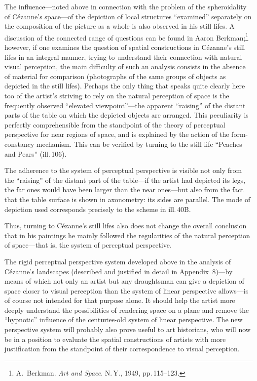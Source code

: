 
The influence---noted above in connection with the problem of the spheroidality of
Cézanne's space---of the depiction of local structures ``examined'' separately on
the composition of the picture as a whole is also observed in his still lifes. A
discussion of the connected range of questions can be found in Aaron
Berkman;\footnote{A.~Berkman. \emph{Art and Space}. N.\,Y., 1949, pp.\,115--123.}
however, if one examines the question of spatial constructions in Cézanne's still
lifes in an integral manner, trying to understand their connection with natural
visual perception, the main difficulty of such an analysis consists in the absence
of material for comparison (photographs of the same groups of objects as depicted in
the still lifes). Perhaps the only thing that speaks quite clearly here too of the
artist's striving to rely on the natural perception of space is the frequently
observed ``elevated viewpoint''---the apparent ``raising'' of the distant parts of
the table on which the depicted objects are arranged. This peculiarity is perfectly
comprehensible from the standpoint of the theory of perceptual perspective for near
regions of space, and is explained by the action of the form-constancy mechanism.
This can be verified by turning to the still life ``Peaches and Pears'' (ill.\,106).



The adherence to the system of perceptual perspective is visible not only from the
``raising'' of the distant part of the table---if the artist had depicted its legs,
the far ones would have been larger than the near ones---but also from the fact that
the table surface is shown in axonometry: its sides are parallel. The mode of
depiction used corresponds precisely to the scheme in ill.\,40B.

Thus, turning to Cézanne's still lifes also does not change the overall conclusion
that in his paintings he mainly followed the regularities of the natural perception
of space---that is, the system of perceptual perspective.

The rigid perceptual perspective system developed above in the analysis of Cézanne's
landscapes (described and justified in detail in Appendix~8)---by means of which not
only an artist but any draughtsman can give a depiction of space closer to visual
perception than the system of linear perspective allows---is of course not intended
for that purpose alone. It should help the artist more deeply understand the
possibilities of rendering space on a plane and remove the ``hypnotic'' influence
of the centuries-old system of linear perspective. The new perspective system will
probably also prove useful to art historians, who will now be in a position to
evaluate the spatial constructions of artists with more justification from the
standpoint of their correspondence to visual perception.

